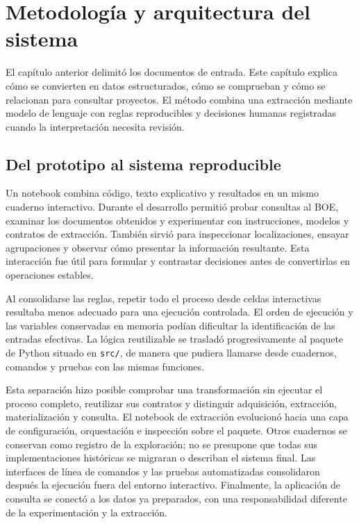 \chapter{Metodología y arquitectura del sistema}
\label{ch:metodologia}
El capítulo anterior delimitó los documentos de entrada. Este capítulo explica
cómo se convierten en datos estructurados, cómo se comprueban y cómo se
relacionan para consultar proyectos. El método combina una extracción
mediante modelo de lenguaje con reglas reproducibles y decisiones humanas
registradas cuando la interpretación necesita revisión.

\section{Del prototipo al sistema reproducible}
Un notebook combina código, texto explicativo y resultados en un mismo
cuaderno interactivo. Durante el desarrollo permitió probar consultas al BOE,
examinar los documentos obtenidos y experimentar con instrucciones, modelos
y contratos de extracción. También sirvió para inspeccionar localizaciones,
ensayar agrupaciones y observar cómo presentar la información resultante.
Esta interacción fue útil para formular y contrastar decisiones antes de
convertirlas en operaciones estables.

Al consolidarse las reglas, repetir todo el proceso desde celdas interactivas
resultaba menos adecuado para una ejecución controlada. El orden de ejecución
y las variables conservadas en memoria podían dificultar la identificación
de las entradas efectivas. La lógica reutilizable se trasladó progresivamente
al paquete de Python situado en \texttt{src/}, de manera que pudiera llamarse
desde cuadernos, comandos y pruebas con las mismas funciones.

Esta separación hizo posible comprobar una transformación sin ejecutar el
proceso completo, reutilizar sus contratos y distinguir adquisición,
extracción, materialización y consulta. El notebook de extracción evolucionó
hacia una capa de configuración, orquestación e inspección sobre el paquete.
Otros cuadernos se conservan como registro de la exploración; no se presupone
que todas sus implementaciones históricas se migraran o describan el sistema
final. Las interfaces de línea de comandos y las pruebas automatizadas
consolidaron después la ejecución fuera del entorno interactivo. Finalmente,
la aplicación de consulta se conectó a los datos ya preparados, con una
responsabilidad diferente de la experimentación y la extracción.

